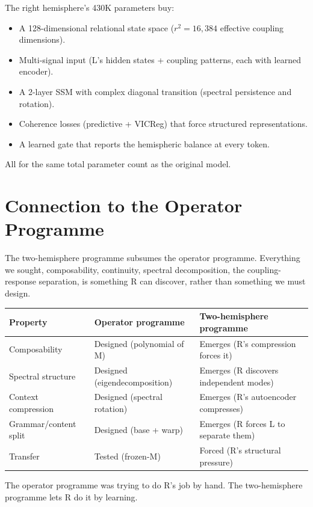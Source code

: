 \documentclass[11pt, a4paper]{article}
\theoremstyle{plain}
\theoremstyle{definition}
\theoremstyle{remark}
\begin{document}
The right hemisphere's 430K parameters buy:
\begin{itemize}[nosep]
\item A 128-dimensional relational state space ($r^2 = 16{,}384$ effective coupling dimensions).
\item Multi-signal input (L's hidden states + coupling patterns, each with learned encoder).
\item A 2-layer SSM with complex diagonal transition (spectral persistence and rotation).
\item Coherence losses (predictive + VICReg) that force structured representations.
\item A learned gate that reports the hemispheric balance at every token.
\end{itemize}

All for the same total parameter count as the original model.


\section{Connection to the Operator Programme}

The two-hemisphere programme subsumes the operator programme.
Everything we sought, composability, continuity, spectral decomposition, the coupling-response separation, is something R can discover, rather than something we must design.

\begin{center}\small
\begin{tabular}{lll}
\toprule
\textbf{Property} & \textbf{Operator programme} & \textbf{Two-hemisphere programme} \\
\midrule
Composability & Designed (polynomial of M) & Emerges (R's compression forces it) \\
Spectral structure & Designed (eigendecomposition) & Emerges (R discovers independent modes) \\
Context compression & Designed (spectral rotation) & Emerges (R's autoencoder compresses) \\
Grammar/content split & Designed (base + warp) & Emerges (R forces L to separate them) \\
Transfer & Tested (frozen-M) & Forced (R's structural pressure) \\
\bottomrule
\end{tabular}
\end{center}

The operator programme was trying to do R's job by hand.
The two-hemisphere programme lets R do it by learning.
\end{document}
